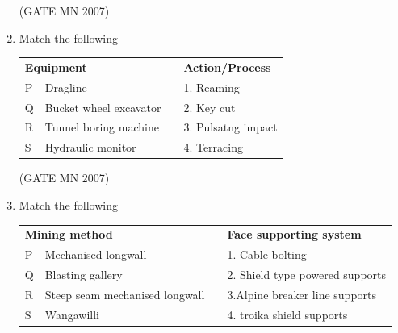 \documentclass[journal]{IEEEtran}
\begin{document}
\begin{enumerate}
\hfill (GATE MN 2007)


\item Match the following

\begin{tabular}{llcl}                             
\multicolumn{2}{l}{\textbf{Equipment  }} & & \textbf{Action/Process} \\
P & Dragline       &  & 1. Reaming \\ 
Q & Bucket wheel excavator    &  & 2. Key cut \\                     
R & Tunnel boring machine   &  & 3. Pulsatng impact    \\                                                
S & Hydraulic monitor   &  & 4. Terracing \\                                       
\end{tabular}


\begin{enumerate}
\end{enumerate}


\hfill (GATE MN 2007)

\item Match the following

\begin{tabular}{llcl}                             
\multicolumn{2}{l}{\textbf{Mining method    }} & & \textbf{Face supporting system} \\                       
P & Mechanised longwall     &  & 1. Cable bolting \\     
Q & Blasting gallery    &  & 2. Shield type powered supports \\                         
R & Steep seam mechanised longwall        &  & 3.Alpine breaker line supports     \\                                               
S & Wangawilli   &  & 4. troika shield supports \\                                          
\end{tabular}


\begin{enumerate}
\end{enumerate}



\end{enumerate}
\end{document}

